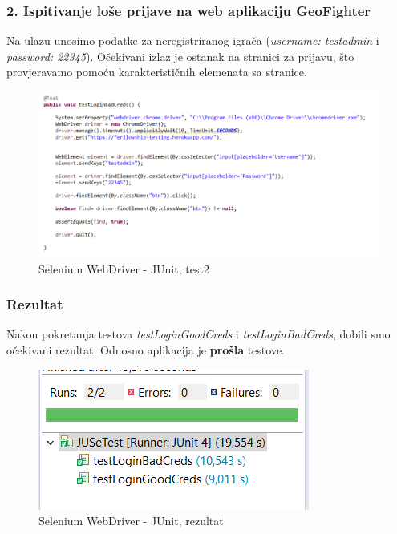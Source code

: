 			\subsubsection{2. Ispitivanje loše prijave na web aplikaciju GeoFighter}
			
				{Na ulazu unosimo podatke za neregistriranog igrača (\emph{username: testadmin} i \emph{password: 22345}). Očekivani izlaz je ostanak na stranici za prijavu, što provjeravamo pomoću karakterističnih elemenata sa stranice.}
			
					\begin{figure}[H]
						\includegraphics[width=\textwidth]{slike/JUSeTest2} 
						\centering
						\caption{Selenium WebDriver - JUnit, test2}
						\label{}
					\end{figure}
			
			\subsubsection{Rezultat}
			
				{Nakon pokretanja testova \emph{testLoginGoodCreds} i \emph{testLoginBadCreds}, dobili smo očekivani rezultat. Odnosno aplikacija je \textbf{prošla} testove.}
			
					\begin{figure}[H]
						\includegraphics[width=\textwidth]{slike/rezultat_JUSeTest} 
						\centering
						\caption{Selenium WebDriver - JUnit, rezultat}
						\label{}
					\end{figure}
				
